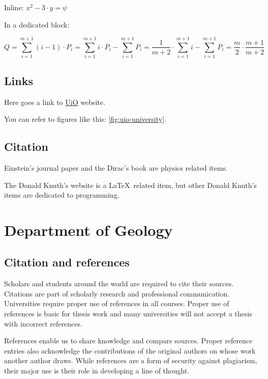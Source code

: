 Inline: $x^2 - 3\cdot y = \psi$

In a dedicated block:

$$Q = \sum_{i=1}^{m+1} (i - 1)\cdot P_i = \sum_{i=1}^{m+1} i\cdot P_i - \sum_{i=1}^{m+1} P_i = \frac{1}{m + 2}\cdot\sum_{i=1}^{m+1} i - \sum_{i=1}^{m+1} P_i = \frac{m}{2}\cdot\frac{m+1}{m+2}$$

\subsection{Links}

Here goes a link to \href{https://www.uio.no/}{UiO} website.

You can refer to figures like this: \autoref{fig:uio-university}.

\subsection{Citation}

Einstein's journal paper \citeyear{einstein1905} and the Dirac's book \cite[Chapter~2]{dirac1981} are physics related items.

The Donald Knuth's website \cite{knuth2016} is a \LaTeX\ related item, but other Donald Knuth's items \cite{knuth1973} are dedicated to programming.

\newpage

\section{Department of Geology}

\subsection{Citation and references}

Scholars and students around the world are required to cite their sources. Citations are part of scholarly research and professional communication. Universities require proper use of references in all courses. Proper use of references is basic for thesis work and many universities will not accept a thesis with incorrect references.

References enable us to share knowledge and compare sources. Proper reference entries also acknowledge the contributions of the original authors on whose work another author draws. While references are a form of security against plagiarism, their major use is their role in developing a line of thought.

